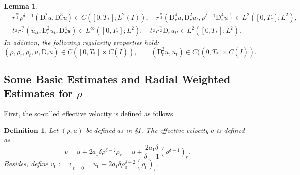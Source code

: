 \documentclass[11pt,reqno]{amsart}
\newtheorem{mydef}{Definition}
\newtheorem{lem}{Lemma}[section]
\numberwithin{rk}{section}
\numberwithin{prop}{section}
\numberwithin{mydef}{section}
\numberwithin{lem}{section}
\numberwithin{equation}{section}
\numberwithin{thm}{section}
\begin{document}
\begin{lem}
\begin{equation}
\begin{aligned}
&r^{\frac{m}{2}}\rho^{\delta-1}(\mathrm{D}_r^2u,\mathrm{D}_r^3u)\in C([0,T_*];L^2(I)),\quad r^{\frac{m}{2}} (\mathrm{D}_r^4 u,\mathrm{D}_r^2 u_t,\rho^{\delta-1}\mathrm{D}_r^4 u)\in L^2([0,T_*];L^2),\\
&t^{\frac{1}{2}}r^{\frac{m}{2}}(u_{tt},\mathrm{D}_r^2 u_t,\mathrm{D}_r^4 u)\in L^\infty([0,T_*];L^2),\quad t^{\frac{1}{2}}r^{\frac{m}{2}} \mathrm{D}_r u_{tt} \in L^2([0,T_*];L^2).
\end{aligned}
\end{equation}
In addition, the following regularity properties hold{\rm :} 
\begin{equation}\label{spd2}
(\rho,\rho_r,\rho_t,u,\mathrm{D}_r u)\in C([0,T_*]\times C(\bar I)),\qquad (\mathrm{D}_r^2 u,u_t)\in C((0,T_*]\times C(\bar I)).
\end{equation}
\end{lem}


 
 



\subsection{Some Basic Estimates and Radial Weighted Estimates for $\rho$}\label{subsection4.2}
First, the so-called effective velocity is defined as follows.
\begin{mydef}\label{def-effective}
Let $(\rho,u)$ be defined as in {\rm \S 1}. The effective velocity $v$ is defined as
\begin{equation}\label{V-expression}
v=u+2a_1\delta\rho^{\delta-2}\rho_r=u+\frac{2a_1\delta}{\delta-1}(\rho^{\delta-1})_r.
\end{equation}
Besides, define $v_0:=v|_{t=0}=u_0+2a_1\delta\rho_0^{\delta-2}(\rho_0)_r$.
\end{mydef} 
\end{document}
